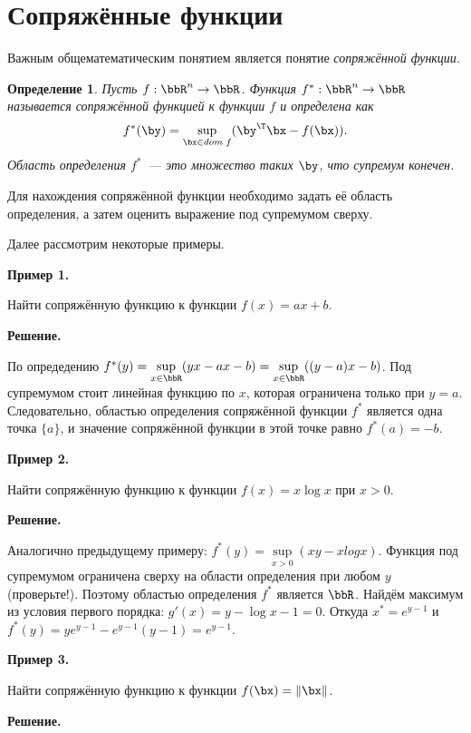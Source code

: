 \documentclass[12pt]{article}
\newtheorem{Def}{ Определение}
\begin{document}
\section{Сопряжённые функции}
Важным общематематическим понятием является понятие \emph{сопряжённой функции}. 
\begin{Def}
Пусть $f: \bbR^n \rightarrow \bbR$. 
Функция $f^*: \bbR^n \rightarrow \bbR$ называется сопряжённой функцией к функции $f$ и определена как
\vspace{-4mm}
\[
f^*(\by) = \sup\limits_{\bx \in dom \; f} (\by^{\T}\bx - f(\bx)).
\vspace{-3mm}
\]
Область определения $f^*$~--- это множество таких $\by$, что супремум конечен.
\end{Def}
Для нахождения сопряжённой функции необходимо задать её область определения, а затем оценить выражение под супремумом сверху.

Далее рассмотрим некоторые примеры.

\textbf{Пример 1.}

Найти сопряжённую функцию к функции $f(x) = ax + b$.

\textbf{Решение.}

По опредедению $f^*(y) = \sup\limits_{x \in \bbR} (yx - ax - b) = \sup\limits_{x \in \bbR} ((y - a)x - b)$. Под супремумом стоит линейная функцию по $x$, которая ограничена только при $y = a$. 
Следовательно, областью определения сопряжённой функции $f^*$ является одна точка $\{ a\}$, и значение сопряжённой функции в этой точке равно $f^*(a) = -b$.

\textbf{Пример 2.}
   
Найти сопряжённую функцию к функции $f(x) = x\log x$ при $x > 0$.

\textbf{Решение.}

Аналогично предыдущему примеру: $f^*(y) = \sup\limits_{x > 0} (xy - xlog x)$. 
Функция под супремумом ограничена сверху на области определения при любом $y$ (проверьте!). 
Поэтому областью определения $f^*$ является $\bbR$.
Найдём максимум из условия первого порядка: $g'(x) = y - \log x - 1 = 0$.
Откуда $x^* = e^{y - 1}$ и $f^*(y) = ye^{y-1} - e^{y-1}(y-1) = e^{y-1}$.

\textbf{Пример 3.}

Найти сопряжённую функцию к функции $f(\bx) = \|\bx\|$.

\textbf{Решение.}
\end{document}
